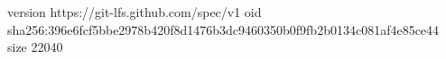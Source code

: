 version https://git-lfs.github.com/spec/v1
oid sha256:396e6fcf5bbe2978b420f8d1476b3dc9460350b0f9fb2b0134c081af4e85ce44
size 22040
